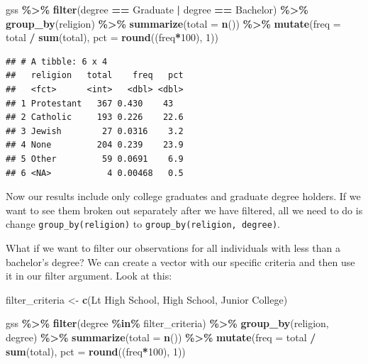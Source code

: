 \documentclass[
]{book}
\newenvironment{Shaded}{\begin{snugshade}}{\end{snugshade}}
\newcommand{\AttributeTok}[1]{\textcolor[rgb]{0.13,0.29,0.53}{#1}}
\newcommand{\DecValTok}[1]{\textcolor[rgb]{0.00,0.00,0.81}{#1}}
\newcommand{\FunctionTok}[1]{\textcolor[rgb]{0.13,0.29,0.53}{\textbf{#1}}}
\newcommand{\NormalTok}[1]{#1}
\newcommand{\OtherTok}[1]{\textcolor[rgb]{0.56,0.35,0.01}{#1}}
\newcommand{\SpecialCharTok}[1]{\textcolor[rgb]{0.81,0.36,0.00}{\textbf{#1}}}
\newcommand{\StringTok}[1]{\textcolor[rgb]{0.31,0.60,0.02}{#1}}
\begin{document}
\begin{Shaded}
\begin{Highlighting}[]
\NormalTok{gss }\SpecialCharTok{\%\textgreater{}\%}
  \FunctionTok{filter}\NormalTok{(degree }\SpecialCharTok{==} \StringTok{\textquotesingle{}Graduate\textquotesingle{}} \SpecialCharTok{|}\NormalTok{ degree }\SpecialCharTok{==} \StringTok{\textquotesingle{}Bachelor\textquotesingle{}}\NormalTok{) }\SpecialCharTok{\%\textgreater{}\%}
  \FunctionTok{group\_by}\NormalTok{(religion) }\SpecialCharTok{\%\textgreater{}\%}
  \FunctionTok{summarize}\NormalTok{(}\AttributeTok{total =} \FunctionTok{n}\NormalTok{()) }\SpecialCharTok{\%\textgreater{}\%}
  \FunctionTok{mutate}\NormalTok{(}\AttributeTok{freq =}\NormalTok{ total }\SpecialCharTok{/} \FunctionTok{sum}\NormalTok{(total),}
         \AttributeTok{pct =} \FunctionTok{round}\NormalTok{((freq}\SpecialCharTok{*}\DecValTok{100}\NormalTok{), }\DecValTok{1}\NormalTok{))}
\end{Highlighting}
\end{Shaded}

\begin{verbatim}
## # A tibble: 6 x 4
##   religion   total    freq   pct
##   <fct>      <int>   <dbl> <dbl>
## 1 Protestant   367 0.430    43  
## 2 Catholic     193 0.226    22.6
## 3 Jewish        27 0.0316    3.2
## 4 None         204 0.239    23.9
## 5 Other         59 0.0691    6.9
## 6 <NA>           4 0.00468   0.5
\end{verbatim}

Now our results include only college graduates and graduate degree holders. If we want to see them broken out separately after we have filtered, all we need to do is change \texttt{group\_by(religion)} to \texttt{group\_by(religion,\ degree)}.

What if we want to filter our observations for all individuals with less than a bachelor's degree? We can create a vector with our specific criteria and then use it in our filter argument. Look at this:

\begin{Shaded}
\begin{Highlighting}[]
\NormalTok{filter\_criteria }\OtherTok{\textless{}{-}} \FunctionTok{c}\NormalTok{(}\StringTok{\textquotesingle{}Lt High School\textquotesingle{}}\NormalTok{, }\StringTok{\textquotesingle{}High School\textquotesingle{}}\NormalTok{, }\StringTok{\textquotesingle{}Junior College\textquotesingle{}}\NormalTok{)}

\NormalTok{gss }\SpecialCharTok{\%\textgreater{}\%}
  \FunctionTok{filter}\NormalTok{(degree }\SpecialCharTok{\%in\%}\NormalTok{ filter\_criteria) }\SpecialCharTok{\%\textgreater{}\%}
  \FunctionTok{group\_by}\NormalTok{(religion, degree) }\SpecialCharTok{\%\textgreater{}\%}
  \FunctionTok{summarize}\NormalTok{(}\AttributeTok{total =} \FunctionTok{n}\NormalTok{()) }\SpecialCharTok{\%\textgreater{}\%}
  \FunctionTok{mutate}\NormalTok{(}\AttributeTok{freq =}\NormalTok{ total }\SpecialCharTok{/} \FunctionTok{sum}\NormalTok{(total),}
         \AttributeTok{pct =} \FunctionTok{round}\NormalTok{((freq}\SpecialCharTok{*}\DecValTok{100}\NormalTok{), }\DecValTok{1}\NormalTok{))}
\end{Highlighting}
\end{Shaded}
\end{document}
